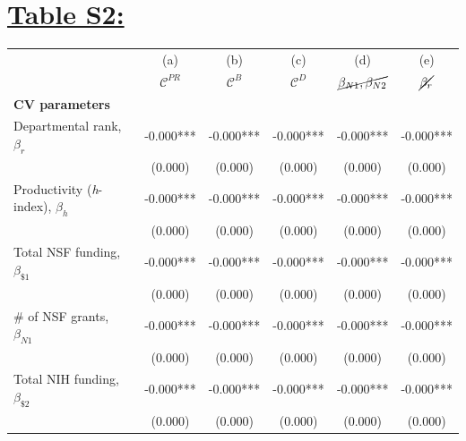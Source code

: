 \documentclass{article}\usepackage[]{graphicx}\usepackage[]{color}
\begin{document}
\section*{\underline{Table S2:}}
\begin{table}[h!]
  \begin{center}
  \label{tab:table1}
  \begin{tabular}{l c c c c c}
  
    \hline
    \hline
    
    {} & {(a)} & {(b)} & {(c)} & {(d)} & {(e)}  \\
    {} & {$\mathscr{C}^{PR}$} & {$\mathscr{C}^{B}$} & {$\mathscr{C}^{D}$} & {$\cancel{\beta_{N1},\beta_{N2}}$} & {$\cancel{\beta_{r}}$}  \\
    
    \hline
    
    \textbf {CV parameters}\\
    
    \rowcolor{gray!33}
    Departmental rank, $\beta_{r}$ 
    & -0.000*** & -0.000***  & -0.000*** & -0.000*** & -0.000*** \\
    {} 
    & (0.000)   & (0.000)    & (0.000)   & (0.000)   & (0.000) \\
    
    \rowcolor{gray!33}
    Productivity (\textit{h}-index), $\beta_{h}$ 
    & -0.000*** & -0.000***  & -0.000*** & -0.000*** & -0.000*** \\
    {} 
    & (0.000)   & (0.000)    & (0.000)   & (0.000)   & (0.000) \\
    
    \rowcolor{gray!33}
    Total NSF funding, $\beta_{\$1}$ 
    & -0.000*** & -0.000***  & -0.000*** & -0.000*** & -0.000*** \\
    {} 
    & (0.000)   & (0.000)    & (0.000)   & (0.000)   & (0.000) \\
    
    \rowcolor{gray!33}
    {\#} of NSF grants, $\beta_{N1}$ 
    & -0.000*** & -0.000***  & -0.000*** & -0.000*** & -0.000*** \\
    {} 
    & (0.000)   & (0.000)    & (0.000)   & (0.000)   & (0.000) \\
    
    \rowcolor{gray!33}
    Total NIH funding, $\beta_{\$2}$ 
    & -0.000*** & -0.000***  & -0.000*** & -0.000*** & -0.000*** \\
    {} 
    & (0.000)   & (0.000)    & (0.000)   & (0.000)   & (0.000) \\
    

\end{tabular}
\end{center}
\end{table}
\end{document}
